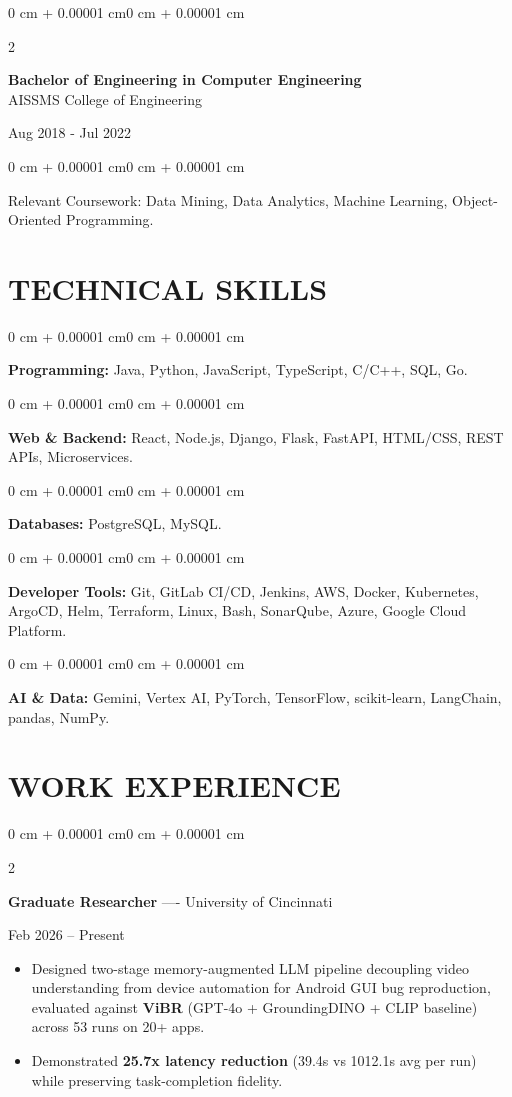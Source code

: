 \documentclass[10pt, letterpaper]{article}
\newenvironment{highlights}{
    \begin{itemize}[
        topsep=0.10 cm,
        parsep=0.06 cm,
        partopsep=0pt,
        itemsep=0.06 cm,
        leftmargin=12pt
    ]
}{
    \end{itemize}
}
\newenvironment{onecolentry}{
    \begin{adjustwidth}{0 cm + 0.00001 cm}{0 cm + 0.00001 cm}
}{
    \end{adjustwidth}
}
\newenvironment{twocolentry}[2][]{
    \onecolentry
    \def\secondColumn{#2}
    \setcolumnwidth{\fill, 4.5 cm}
    \begin{paracol}{2}
}{
    \switchcolumn \raggedleft \secondColumn
    \end{paracol}
    \endonecolentry
}
\begin{document}
\begin{twocolentry}{
    Aug 2018 - Jul 2022
}
    \textbf{Bachelor of Engineering in Computer Engineering} \\
    AISSMS College of Engineering
\end{twocolentry}
\begin{onecolentry}
Relevant Coursework: Data Mining, Data Analytics, Machine Learning, Object-Oriented Programming.
\end{onecolentry}
\section{TECHNICAL SKILLS}
\begin{onecolentry}
\textbf{Programming:} Java, Python, JavaScript, TypeScript, C/C++, SQL, Go.
\end{onecolentry}
\vspace{0.06 cm}
\begin{onecolentry}
\textbf{Web \& Backend:} React, Node.js, Django, Flask, FastAPI, HTML/CSS, REST APIs, Microservices.
\end{onecolentry}
\vspace{0.06 cm}
\begin{onecolentry}
\textbf{Databases:} PostgreSQL, MySQL.
\end{onecolentry}
\vspace{0.06 cm}
\begin{onecolentry}
\textbf{Developer Tools:} Git, GitLab CI/CD, Jenkins, AWS, Docker, Kubernetes, ArgoCD, Helm, Terraform, Linux, Bash, SonarQube, Azure, Google Cloud Platform.
\end{onecolentry}
\vspace{0.06 cm}
\begin{onecolentry}
\textbf{AI \& Data:} Gemini, Vertex AI, PyTorch, TensorFlow, scikit-learn, LangChain, pandas, NumPy.
\end{onecolentry}

\section{WORK EXPERIENCE}
\begin{twocolentry}{Feb 2026 -- Present}
\textbf{Graduate Researcher} ---- University of Cincinnati
\end{twocolentry}
\begin{highlights}
  \item Designed two-stage memory-augmented LLM pipeline decoupling video understanding from device automation for Android GUI bug reproduction, evaluated against \textbf{ViBR} (GPT-4o + GroundingDINO + CLIP baseline) across 53 runs on 20+ apps.
  \item Demonstrated \textbf{25.7x latency reduction} (39.4s vs 1012.1s avg per run) while preserving task-completion fidelity.
\end{highlights}
\end{document}
